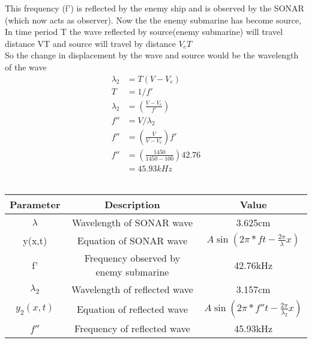 \documentclass[journal,12pt,twocolumn]{IEEEtran}
\theoremstyle{remark}
\begin{document}
This frequency (f') is reflected by the enemy ship and is observed by the SONAR (which now acts as observer).
Now the the enemy submarine has become source,\\
In time period T the wave reflected by source(enemy submarine) will travel distance VT and source will travel by distance $V_eT$\\
So the change in displacement by the wave and source would be the wavelength of the wave
\begin{align}
\lambda_2&=T(V-V_e)\\
T&=1/f'\\
\lambda_2&=(\frac{V-V_e}{f'})\\
f''&=V/\lambda_2\\
f''&=(\frac{V}{V-V_e})f'\\
f''&=(\frac{1450}{1450-100})42.76\\
&=45.93kHz
\end{align}
\\
\footnotesize
\begin{tabular}{|c|c|c|}
   \hline
   Parameter & Description & Value\\
   \hline
    $ \lambda$ & Wavelength of SONAR wave & 3.625cm\\
   \hline
   y(x,t) & Equation of SONAR wave & $A\sin(2\pi*ft-\frac{2\pi}{\lambda}x)$\\
   \hline
   f' & Frequency observed by enemy submarine & 42.76kHz\\
   \hline
   $\lambda_2$ & Wavelength of reflected wave & 3.157cm\\
   \hline 
   $ y_2(x,t)$ & Equation of reflected wave & $A\sin(2\pi*f''t-\frac{2\pi}{\lambda_2}x)$\\
   \hline
   $f''$& Frequency of reflected wave & 45.93kHz\\
   \hline
   
 
\end{tabular}
\end{document}
